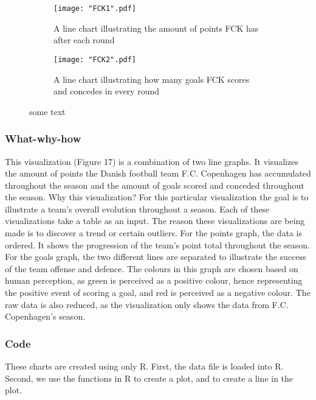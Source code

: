 \documentclass[Report.tex]{subfiles}
\begin{document}
\begin{figure}
\center
\begin{subfigure}[b]{0.8\textwidth}
\texttt{[image: "FCK1".pdf]}
\caption{A line chart illustrating the amount of points FCK has after each round}
\end{subfigure}

\begin{subfigure}[b]{0.8\textwidth}
\texttt{[image: "FCK2".pdf]}
\caption{A line chart illustrating how many goals FCK scores and concedes in every round}
\end{subfigure}
\caption{some text}
\end{figure}


\subsubsection{What-why-how}
This visualization (Figure 17) is a combination of two line graphs. It visualizes the amount of points the Danish football team F.C. Copenhagen has accumulated throughout the season and the amount of goals scored and conceded throughout the season. Why this visualization? For this particular visualization the goal is to illustrate a team’s overall evolution throughout a season. Each of these visualizations take a table as an input. The reason these visualizations are being made is to discover a trend or certain outliers. For the points graph, the data is ordered. It shows the progression of the team’s point total throughout the season. For the goals graph, the two different lines are separated to illustrate the success of the team offense and defence. The colours in this graph are chosen based on human perception, as green is perceived as a positive colour, hence representing the positive event of scoring a goal, and red is perceived as a negative colour. The raw data is also reduced, as the visualization only shows the data from F.C. Copenhagen’s season. 
\subsubsection{Code}
These charts are created using only R. First, the data file is loaded into R. Second, we use the functions in R to create a plot, and to create a line in the plot. 
\end{document}
